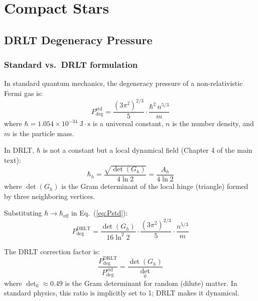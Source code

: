\section{Compact Stars}
\label{ch:compact_stars}

\subsection{DRLT Degeneracy Pressure}

\subsubsection{Standard vs.\ DRLT formulation}

In standard quantum mechanics, the degeneracy pressure of a non-relativistic Fermi gas is:
\begin{equation}
P_\text{deg}^\text{std} = \frac{(3\pi^2)^{2/3}}{5} \cdot \frac{\hbar^2\,n^{5/3}}{m}
\label{eq:Pstd}
\end{equation}
where $\hbar = 1.054 \times 10^{-34}\;\text{J}\cdot\text{s}$ is a universal constant, $n$ is the number density, and $m$ is the particle mass.

In DRLT, $\hbar$ is not a constant but a local dynamical field (Chapter 4 of the main text):
\begin{equation}
\hbar_h = \frac{\sqrt{\det(G_h)}}{4\ln 2} = \frac{A_h}{4\ln 2}
\end{equation}
where $\det(G_h)$ is the Gram determinant of the local hinge (triangle) formed by three neighboring vertices.

Substituting $\hbar \to \hbar_\text{eff}$ in Eq.~(\ref{eq:Pstd}):
\begin{equation}
\boxed{P_\text{deg}^\text{DRLT} = \frac{\det(G_h)}{16\ln^2 2} \cdot \frac{(3\pi^2)^{2/3}}{5} \cdot \frac{n^{5/3}}{m}}
\label{eq:Pdrlt}
\end{equation}

The DRLT correction factor is:
\begin{equation}
\frac{P_\text{deg}^\text{DRLT}}{P_\text{deg}^\text{std}} = \frac{\det(G_h)}{\det_0}
\end{equation}
where $\det_0 \approx 0.49$ is the Gram determinant for random (dilute) matter. In standard physics, this ratio is implicitly set to 1; DRLT makes it dynamical.


